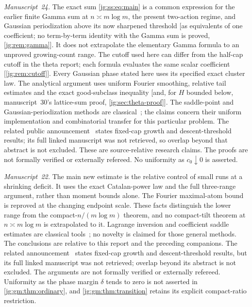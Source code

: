 \documentclass[11pt,a4paper]{article}
\theoremstyle{definition}\newaliascnt{definition}{theorem}
\theoremstyle{remark}\newaliascnt{remark}{theorem}
\begin{document}
\emph{Manuscript~24.} The exact sum \eqref{jg:ss:eq:main} is a common expression
for the earlier finite Gamma sum at $n\asymp m\log m$, the present two-action
regime, and Gaussian periodization above its now sharpened threshold [as
equivalents of one coefficient; no term-by-term identity with the Gamma sum is
proved, \cref{jg:rem:gamma}]. It does not extrapolate the elementary Gamma
formula to an unproved growing-count range. The cutoff used here can differ
from the half-cap cutoff in the theta report; each formula evaluates the same
scalar coefficient [\cref{jg:rem:cutoff}]. Every Gaussian phase stated here
uses its specified exact cluster law. The analytical argument uses uniform
Fourier smoothing, relative tail estimates and the exact good-subclass
inequality [and, for $H$ bounded below, manuscript~30's lattice-sum proof,
\cref{jg:sec:theta-proof}]. The saddle-point and Gaussian-periodization methods
are classical~\cite{jg:FlajoletSedgewick,jg:DLMF}; the claims concern their
uniform implementation and combinatorial transfer for this particular problem.
The related public announcement~\cite{jg:Li} states fixed-cap growth and
descent-threshold results; its full linked manuscript was not retrieved, so
overlap beyond that abstract is not excluded. These are source-relative research
claims. The proofs are not formally verified or externally refereed. No
uniformity as $c_0\downarrow0$ is asserted.

\emph{Manuscript~22.} The main new estimate is the relative control of small
runs at a shrinking deficit. It uses the exact Catalan-power law and the full
three-range argument, rather than moment bounds alone. The Fourier
maximal-atom bound is reproved at the changing endpoint scale. These facts
distinguish the lower range from the compact-$n/(m\log m)$ theorem, and no
compact-tilt theorem at $n\asymp m\log m$ is extrapolated to it. Lagrange
inversion and coefficient saddle estimates are classical
tools~\cite{jg:FlajoletSedgewick}; no novelty is claimed for those general
methods. The conclusions are relative to this report and the preceding
companions. The related announcement~\cite{jg:Li} states fixed-cap growth and
descent-threshold results, but its full linked manuscript was not retrieved;
overlap beyond its abstract is not excluded. The arguments are not formally
verified or externally refereed. Uniformity as the phase margin $\delta$ tends
to zero is not asserted in \cref{jg:gm:thm:ordinary}, and
\cref{jg:gm:thm:transition} retains its explicit compact-ratio restriction.
\end{document}
